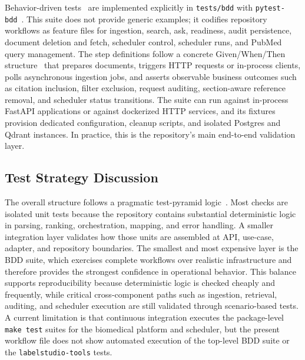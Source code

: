 Behavior-driven tests~\cite{north2006bdd} are implemented explicitly in \texttt{tests/bdd} with \texttt{pytest-bdd}~\cite{pytestbdd2026docs}. This suite does not provide generic examples; it codifies repository workflows as feature files for ingestion, search, ask, readiness, audit persistence, document deletion and fetch, scheduler control, scheduler runs, and PubMed query management. The step definitions follow a concrete Given/When/Then structure~\cite{cucumber2026gherkin} that prepares documents, triggers HTTP requests or in-process clients, polls asynchronous ingestion jobs, and asserts observable business outcomes such as citation inclusion, filter exclusion, request auditing, section-aware reference removal, and scheduler status transitions. The suite can run against in-process FastAPI applications or against dockerized HTTP services, and its fixtures provision dedicated configuration, cleanup scripts, and isolated Postgres and Qdrant instances. In practice, this is the repository's main end-to-end validation layer.

\subsection{Test Strategy Discussion}

The overall structure follows a pragmatic test-pyramid logic~\cite{cohn2009succeeding}. Most checks are isolated unit tests because the repository contains substantial deterministic logic in parsing, ranking, orchestration, mapping, and error handling. A smaller integration layer validates how those units are assembled at API, use-case, adapter, and repository boundaries. The smallest and most expensive layer is the BDD suite, which exercises complete workflows over realistic infrastructure and therefore provides the strongest confidence in operational behavior. This balance supports reproducibility because deterministic logic is checked cheaply and frequently, while critical cross-component paths such as ingestion, retrieval, auditing, and scheduler execution are still validated through scenario-based tests. A current limitation is that continuous integration executes the package-level \texttt{make test} suites for the biomedical platform and scheduler, but the present workflow file does not show automated execution of the top-level BDD suite or the \texttt{labelstudio-tools} tests.

